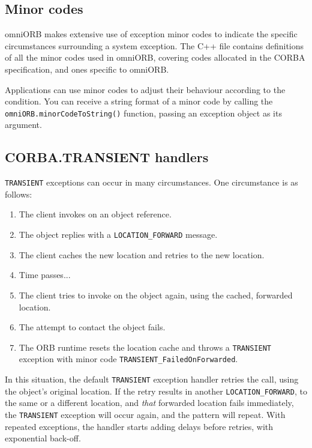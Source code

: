 \documentclass[11pt,oneside,a4paper]{book}
\newcommand{\code}[1]{\texttt{#1}}
\newcommand{\op}[1]{\texttt{#1()}}
\newcommand{\dsc}{\discretionary{}{}{}}
\begin{document}
\subsection{Minor codes}

omniORB makes extensive use of exception minor codes to indicate the
specific circumstances surrounding a system exception.  The C++ file
 contains definitions of all the
minor codes used in omniORB, covering codes allocated in the CORBA
specification, and ones specific to omniORB.

Applications can use minor codes to adjust their behaviour according
to the condition. You can receive a string format of a minor code by
calling the \op{omniORB.\dsc{}minorCodeToString} function, passing an
exception object as its argument.



\subsection{CORBA.TRANSIENT handlers}

\code{TRANSIENT} exceptions can occur in many circumstances. One
circumstance is as follows:

\begin{enumerate}

\item The client invokes on an object reference.
\item The object replies with a \code{LOCATION\_FORWARD} message.
\item The client caches the new location and retries to the new location.
\item Time passes...
\item The client tries to invoke on the object again, using the
      cached, forwarded location. 
\item The attempt to contact the object fails.
\item The ORB runtime resets the location cache and throws a
      \code{TRANSIENT} exception with minor code
      \code{TRANSIENT\_FailedOnForwarded}.

\end{enumerate}

In this situation, the default \code{TRANSIENT} exception handler
retries the call, using the object's original location. If the retry
results in another \code{LOCATION\_\dsc{}FORWARD}, to the same or a
different location, and \emph{that} forwarded location fails
immediately, the \code{TRANSIENT} exception will occur again, and the
pattern will repeat. With repeated exceptions, the handler starts
adding delays before retries, with exponential back-off.
\end{document}
